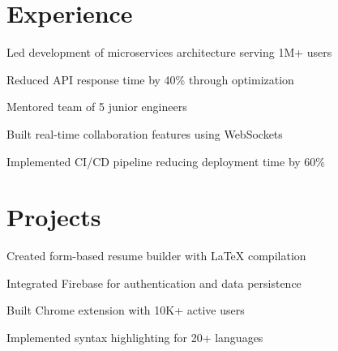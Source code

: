 \documentclass[]{deedy-resume-reversed}
\begin{document}


\begin{minipage}[t]{0.60\textwidth}

\section{Experience}
\vspace{\topsep} %
\begin{tightemize}
\item Led development of microservices architecture serving 1M+ users
\item Reduced API response time by 40\% through optimization
\item Mentored team of 5 junior engineers
\end{tightemize}
\sectionsep

\begin{tightemize}
\item Built real-time collaboration features using WebSockets
\item Implemented CI/CD pipeline reducing deployment time by 60\%
\end{tightemize}
\sectionsep


\section{Projects}
\begin{tightemize}
\item Created form-based resume builder with LaTeX compilation
\item Integrated Firebase for authentication and data persistence
\end{tightemize}
\sectionsep

\begin{tightemize}
\item Built Chrome extension with 10K+ active users
\item Implemented syntax highlighting for 20+ languages
\end{tightemize}
\sectionsep




\end{minipage}
\end{document}
